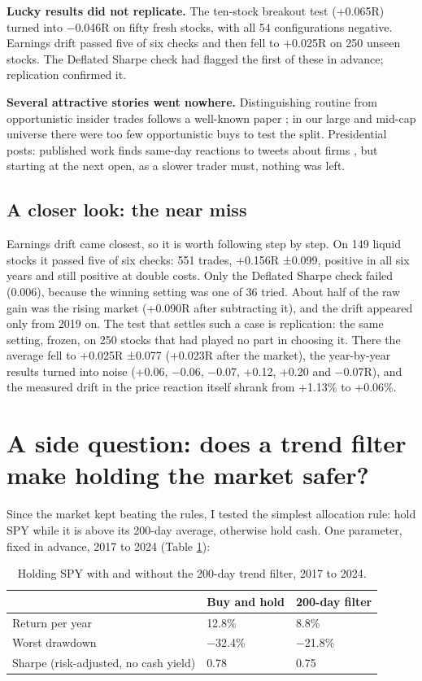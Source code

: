 \documentclass[11pt,a4paper]{article}
\begin{document}
\textbf{Lucky results did not replicate.} The ten-stock breakout test (+0.065R) turned into −0.046R on fifty fresh stocks, with
all 54 configurations negative. Earnings drift passed five of six checks and then fell to +0.025R on 250 unseen stocks.
The Deflated Sharpe check had flagged the first of these in advance; replication confirmed it.

\textbf{Several attractive stories went nowhere.} Distinguishing routine from opportunistic insider trades follows a well-known
paper \cite{cohen2012};
in our large and mid-cap universe there were too few opportunistic buys to test the split. Presidential posts: published
work finds same-day reactions to tweets about firms
\cite{ajjoub2021}, but starting at the next
open, as a slower trader must, nothing was left.

\subsection{A closer look: the near miss}\label{a-closer-look-the-near-miss}

Earnings drift came closest, so it is worth following step by step. On 149 liquid stocks it passed five of six checks: 551
trades, +0.156R ±0.099, positive in all six years and still positive at double costs. Only the Deflated Sharpe check failed
(0.006), because the winning setting was one of 36 tried. About half of the raw gain was the rising market (+0.090R after
subtracting it), and the drift appeared only from 2019 on. The test that settles such a case is replication: the same setting,
frozen, on 250 stocks that had played no part in choosing it. There the average fell to +0.025R ±0.077 (+0.023R after the
market), the year-by-year results turned into noise (+0.06, −0.06, −0.07, +0.12, +0.20 and −0.07R), and the measured drift
in the price reaction itself shrank from +1.13\% to +0.06\%.

\section{A side question: does a trend filter make holding the market safer?}\label{sec:trend}

Since the market kept beating the rules, I tested the simplest allocation rule: hold SPY while it is above its 200-day
average, otherwise hold cash. One parameter, fixed in advance, 2017 to 2024 (Table \ref{tbl:trend}):

\begin{table}[H]
\centering
\caption{Holding SPY with and without the 200-day trend filter, 2017 to 2024.}\label{tbl:trend}
\begin{tabular}{@{}lll@{}}
\toprule
& Buy and hold & 200-day filter \\
\midrule
Return per year & 12.8\% & 8.8\% \\
Worst drawdown & −32.4\% & −21.8\% \\
Sharpe (risk-adjusted, no cash yield) & 0.78 & 0.75 \\
\bottomrule
\end{tabular}
\end{table}
\end{document}
